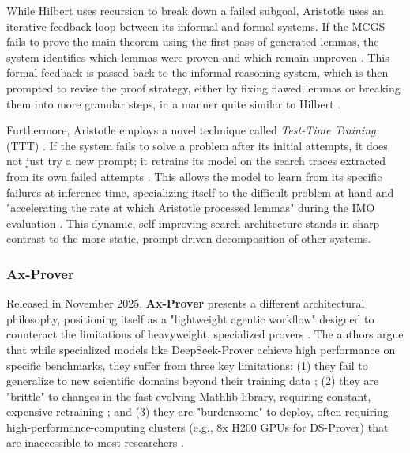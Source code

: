 \documentclass[12pt, letterpaper]{article}
\begin{document}
While Hilbert uses recursion to break down a failed subgoal, Aristotle uses an iterative feedback loop between its informal and formal systems. If the MCGS fails to prove the main theorem using the first pass of generated lemmas, the system identifies which lemmas were proven and which remain unproven \citep{achim2025aristotleimolevelautomatedtheorem}. This formal feedback is passed back to the informal reasoning system, which is then prompted to {revise} the proof strategy, either by fixing flawed lemmas or breaking them into more granular steps, in a manner quite similar to Hilbert \citep{achim2025aristotleimolevelautomatedtheorem}.

Furthermore, Aristotle employs a novel technique called \textit{Test-Time Training} (TTT) \citep{achim2025aristotleimolevelautomatedtheorem}. If the system fails to solve a problem after its initial attempts, it does not just try a new prompt; it {retrains its model} on the search traces extracted from its own failed attempts \citep{achim2025aristotleimolevelautomatedtheorem}. This allows the model to learn from its specific failures at inference time, specializing itself to the difficult problem at hand and "accelerating the rate at which Aristotle processed lemmas" during the IMO evaluation \citep{achim2025aristotleimolevelautomatedtheorem}. This dynamic, self-improving search architecture stands in sharp contrast to the more static, prompt-driven decomposition of other systems.

\subsubsection{Ax-Prover}
\label{sec:axprover}

Released in November 2025, \textbf{Ax-Prover} presents a different architectural philosophy, positioning itself as a "lightweight agentic workflow" designed to counteract the limitations of heavyweight, specialized provers \citep{breen2025axproverdeepreasoningagentic}. The authors argue that while specialized models like DeepSeek-Prover achieve high performance on specific benchmarks, they suffer from three key limitations: (1) they fail to generalize to new scientific domains beyond their training data \citep{breen2025axproverdeepreasoningagentic}; (2) they are "brittle" to changes in the fast-evolving Mathlib library, requiring constant, expensive retraining \citep{breen2025axproverdeepreasoningagentic}; and (3) they are "burdensome" to deploy, often requiring high-performance-computing clusters (e.g., 8x H200 GPUs for DS-Prover) that are inaccessible to most researchers \citep{breen2025axproverdeepreasoningagentic}.
\end{document}
